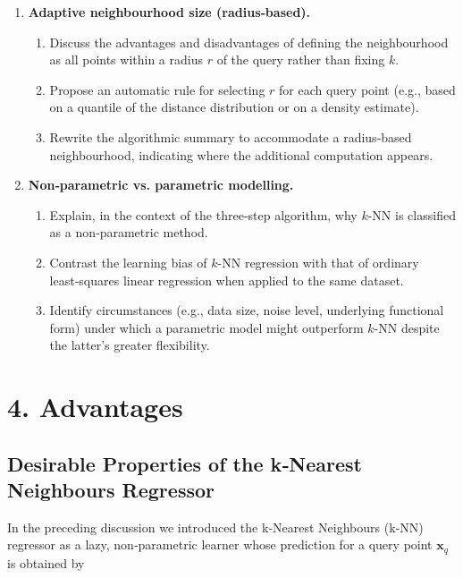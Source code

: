 \documentclass[12pt, a4paper]{article}
\begin{document}
\begin{enumerate}
    \item \textbf{Adaptive neighbourhood size (radius‑based).}
    \begin{enumerate}
        \item Discuss the advantages and disadvantages of defining the neighbourhood as all points within a radius \(r\) of the query rather than fixing \(k\).
        \item Propose an automatic rule for selecting \(r\) for each query point (e.g., based on a quantile of the distance distribution or on a density estimate).
        \item Rewrite the algorithmic summary to accommodate a radius‑based neighbourhood, indicating where the additional computation appears.
    \end{enumerate}
    
    \item \textbf{Non‑parametric vs. parametric modelling.}
    \begin{enumerate}
        \item Explain, in the context of the three‑step algorithm, why \(k\)-NN is classified as a non‑parametric method.
        \item Contrast the learning bias of \(k\)-NN regression with that of ordinary least‑squares linear regression when applied to the same dataset.
        \item Identify circumstances (e.g., data size, noise level, underlying functional form) under which a parametric model might outperform \(k\)-NN despite the latter’s greater flexibility.
    \end{enumerate}
\end{enumerate}

\newpage

\section{4. Advantages}
\subsection{Desirable Properties of the k‑Nearest Neighbours Regressor}

In the preceding discussion we introduced the k‑Nearest Neighbours (k‑NN) regressor as a lazy, non‑parametric learner whose prediction for a query point \(\mathbf{x}_q\) is obtained by  
\end{document}
